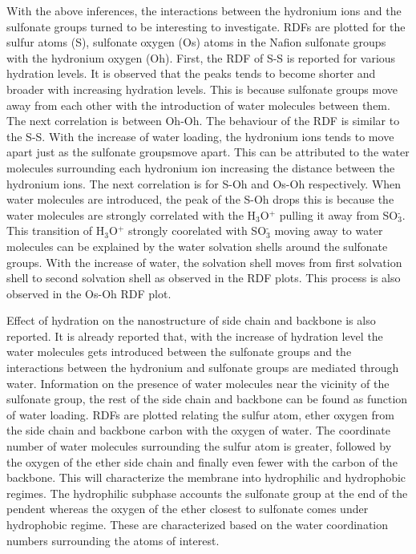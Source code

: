 \documentclass{article}
\begin{document}
With the above inferences, the interactions between the hydronium ions and the sulfonate groups turned to be interesting to investigate. RDFs are plotted for the sulfur atoms (S), sulfonate oxygen (Os) atoms in the Nafion sulfonate groups with the hydronium oxygen (Oh). First, the RDF of S-S is reported for various hydration levels. It is observed that the peaks tends to become shorter and broader with increasing hydration levels. This is because sulfonate groups move away from each other with the introduction of water molecules between them. The next correlation is between Oh-Oh. The behaviour of the RDF is similar to the S-S. With the increase of water loading, the hydronium ions tends to move apart just as the sulfonate groupsmove apart. This can be attributed to the water molecules surrounding each hydronium ion increasing the distance between the hydronium ions. The next correlation is for S-Oh and Os-Oh respectively. When water molecules are introduced, the peak of the S-Oh drops this is because the water molecules are strongly correlated with the H$_{\text{3}}$O$^{\text{+}}$ pulling it away from SO$_{\text{3}}^{\text{-}}$. This transition of H$_{\text{3}}$O$^{\text{+}}$ strongly coorelated with SO$_{\text{3}}^{\text{-}}$ moving away to water molecules can be explained by the water solvation shells around the sulfonate groups. With the increase of water, the solvation shell moves from first solvation shell to second solvation shell as observed in the RDF plots. This process is also observed in the Os-Oh RDF plot.

Effect of hydration on the nanostructure of side chain and backbone is also reported. It is already reported that, with the increase of hydration level the water molecules gets introduced between the sulfonate groups and the interactions between the hydronium and sulfonate groups are mediated through water. Information on the presence of water molecules near the vicinity of the sulfonate group, the rest of the side chain and backbone can be found as function of water loading. RDFs are plotted relating the sulfur atom, ether oxygen from the side chain and backbone carbon with the oxygen of water. The coordinate number of water molecules surrounding the sulfur atom is greater, followed by the oxygen of the ether side chain and finally even fewer with the carbon of the backbone. This will characterize the membrane into hydrophilic and hydrophobic regimes. The hydrophilic subphase accounts the sulfonate group at the end of the pendent whereas the oxygen of the ether closest to sulfonate comes under hydrophobic regime. These are characterized based on the water coordination numbers surrounding the atoms of interest.
\end{document}
